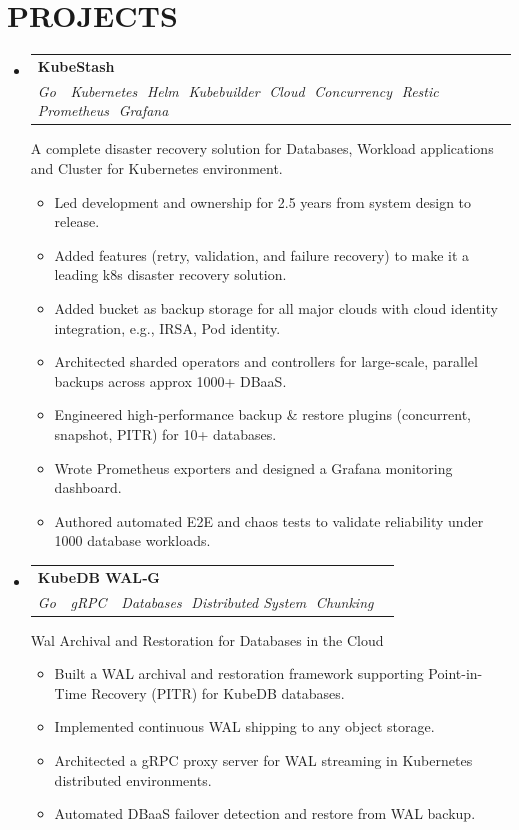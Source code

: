 \documentclass[letterpaper,11pt]{article}
\makeatletter
\newcommand{\resumeItem}[1]{
  \item\small{
    {#1 \vspace{-1pt}}
  }
}
\newcommand{\resumeSubheading}[4]{
  \vspace{-2pt}\item
    \begin{tabular*}{1.0\textwidth}[t]{l@{\extracolsep{\fill}}r}
      \textbf{\large#1} & \textbf{\small #2} \\
      \textit{\large#3} & \textit{\small #4} \\
    \end{tabular*}\vspace{-7pt}
}
\newcommand{\resumeSubHeadingListStart}{\begin{itemize}[leftmargin=0.0in, label={}]}
\newcommand{\resumeSubHeadingListEnd}{\end{itemize}}
\newcommand{\resumeItemListStart}{\begin{itemize}[leftmargin=0.1in]}
\newcommand{\resumeItemListEnd}{\end{itemize}\vspace{-5pt}}
\makeatother
\begin{document}
\section{\color{airforceblue}PROJECTS}
  \resumeSubHeadingListStart
    \resumeSubheading
       {KubeStash \href{https://kubestash.com}{\faGlobe} \, \href{https://github.com/kubestash}{\faGithub}}{}
       {\small Go \,\textbullet\, \small Kubernetes \,\textbullet\,\small Helm \,\textbullet\,\small Kubebuilder \,\textbullet\,\small Cloud \,\textbullet\,\small Concurrency \,\textbullet\,\small Restic \,\textbullet\, \small Prometheus \,\textbullet\,\small Grafana}{}      
       
       {A complete disaster recovery solution for Databases, Workload applications and Cluster for Kubernetes environment.}{}
      \resumeItemListStart
          \resumeItem{\normalsize{Led development and ownership for 2.5 years from system design to release.}}
          \resumeItem{\normalsize{Added features (retry, validation, and failure recovery) to make it a leading k8s disaster recovery solution.}}
          \resumeItem{\normalsize{Added bucket as backup storage for all major clouds with cloud identity integration, e.g., IRSA, Pod identity.}}
          \resumeItem{\normalsize{Architected sharded operators and controllers for large-scale, parallel backups across approx 1000+ DBaaS.}}
          \resumeItem{\normalsize{Engineered high-performance backup \& restore plugins (concurrent, snapshot, PITR) for 10+ databases.}}
          \resumeItem{\normalsize{Wrote Prometheus exporters and designed a Grafana monitoring dashboard.}}
          \resumeItem{\normalsize{Authored automated E2E and chaos tests to validate reliability under 1000 database workloads.}}
      \resumeItemListEnd  
    
    \vspace{10pt}
    
    \resumeSubheading
       {KubeDB WAL‑G \href{https://kubedb.com/docs/v2026.1.19/guides/mssqlserver/pitr/archiver/}{\faGlobe} \, \href{https://github.com/kubedb/wal-g}{\faGithub}}{}
       {\small Go \,\textbullet\, \small gRPC \,\textbullet\, \small Databases \,\textbullet\,\small Distributed System \,\textbullet\,\small Chunking}{}      
       
       {Wal Archival and Restoration for Databases in the Cloud}{}
      \resumeItemListStart
          \resumeItem{\normalsize{Built a WAL archival and restoration framework supporting Point-in-Time Recovery (PITR) for KubeDB databases.}}
          \resumeItem{\normalsize{Implemented continuous WAL shipping to any object storage.}}
          \resumeItem{\normalsize{Architected a gRPC proxy server for WAL streaming in Kubernetes distributed environments.}}
          \resumeItem{\normalsize{Automated DBaaS failover detection and restore from WAL backup.}}
      \resumeItemListEnd  
  \resumeSubHeadingListEnd
\vspace{-12pt}
\end{document}
